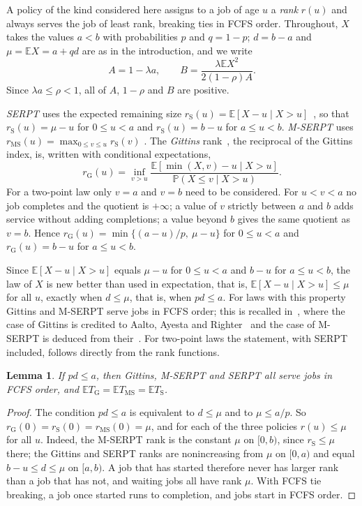 \documentclass[11pt]{amsart}
\newtheorem{lemma}[theorem]{Lemma}
\theoremstyle{remark}
\numberwithin{equation}{section}
\newcommand{\PP}{\mathbb{P}}
\newcommand{\E}{\mathbb{E}}
\begin{document}
A policy of the kind considered here assigns to a job of age $u$ a
\emph{rank} $r(u)$ and always serves the job of least rank, breaking ties
in FCFS order. Throughout, $X$ takes the values $a<b$ with probabilities
$p$ and $q=1-p$; $d=b-a$ and $\mu=\E X=a+qd$ are as in the introduction, and we write
\[
A=1-\lambda a,\qquad
B=\frac{\lambda\E X^2}{2(1-\rho)A}.
\]
Since $\lambda a\le\rho<1$, all of $A$, $1-\rho$ and $B$ are positive.

\emph{SERPT} uses the expected remaining size
$r_{\mathrm S}(u)=\E[X-u\mid X>u]$~\cite[Definition~2.2]{SHS20}, so that $r_{\mathrm S}(u)=\mu-u$ for
$0\le u<a$ and $r_{\mathrm S}(u)=b-u$ for $a\le u<b$. \emph{M-SERPT} uses
$r_{\mathrm{MS}}(u)=\max_{0\le v\le u}r_{\mathrm S}(v)$
\cite[Definition~2.4]{SHS20}. The \emph{Gittins} rank~\cite[Definition~2.1]{SHS20}, the reciprocal of
the Gittins index, is, written with conditional expectations,
\[
r_{\mathrm G}(u)=\inf_{v>u}\frac{\E[\min(X,v)-u\mid X>u]}{\PP(X\le v\mid X>u)} .
\]
For a two-point law only $v=a$ and $v=b$ need to be considered. For
$u<v<a$ no job completes and the quotient is $+\infty$; a
value of $v$ strictly between $a$ and $b$ adds service without adding
completions; a value beyond $b$ gives the same quotient as $v=b$. Hence $r_{\mathrm G}(u)=\min\{(a-u)/p,\ \mu-u\}$ for
$0\le u<a$ and $r_{\mathrm G}(u)=b-u$ for $a\le u<b$.

Since $\E[X-u\mid X>u]$ equals $\mu-u$ for $0\le u<a$ and $b-u$ for
$a\le u<b$, the law of $X$ is new better than used in expectation, that
is, $\E[X-u\mid X>u]\le\mu$ for all $u$, exactly when $d\le\mu$, that is,
when $pd\le a$. For laws with this property Gittins and M-SERPT serve jobs
in FCFS order; this is recalled in~\cite[Section~8.2]{SHS20}, where the case of
Gittins is credited to Aalto, Ayesta and Righter~\cite{AAR09} and the
case of M-SERPT is deduced from their~\cite[Proposition~9]{AAR11}. For two-point laws the statement, with SERPT included, follows directly from the rank functions.

\begin{lemma}\label{lem:fcfs}
If $pd\le a$, then Gittins, M-SERPT and SERPT all serve jobs in FCFS order,
and $\E T_{\mathrm G}=\E T_{\mathrm{MS}}=\E T_{\mathrm S}$.
\end{lemma}

\begin{proof}
The condition $pd\le a$ is equivalent to $d\le\mu$ and to $\mu\le a/p$. So
$r_{\mathrm G}(0)=r_{\mathrm S}(0)=r_{\mathrm{MS}}(0)=\mu$, and for each of
the three policies $r(u)\le\mu$ for all $u$. Indeed, the M-SERPT rank is
the constant $\mu$ on $[0,b)$, since $r_{\mathrm S}\le\mu$ there; the
Gittins and SERPT ranks are nonincreasing from $\mu$ on $[0,a)$ and equal
$b-u\le d\le\mu$ on $[a,b)$. A job that has started therefore never has larger rank
than a job that has not, and waiting jobs all have rank $\mu$. With FCFS
tie breaking, a job once started runs to completion, and jobs start in
FCFS order.
\end{proof}
\end{document}
